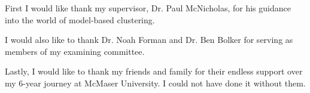 
First I would like thank my supervisor, Dr. Paul McNicholas, for his guidance into the world of model-based clustering. 

I would also like to thank Dr. Noah Forman and Dr. Ben Bolker for serving as members of my examining committee.

Lastly, I would like to thank my friends and family for their endless support over my 6-year journey at McMaser University. I could not have done it without them.  
